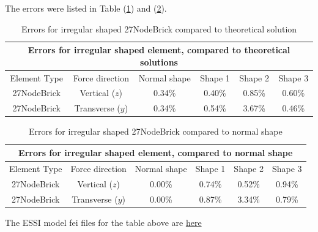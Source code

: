 \documentclass[fleqn,11pt]{article}
\begin{document}
The errors were listed in Table (\ref{table Errors for irregular shaped 27NodeBrick compared to theoretical solution}) and (\ref{talbe Errors for irregular shaped 27NodeBrick compared to normal shape}).


\begin{table}[H]
  \centering
  \caption{Errors for irregular shaped 27NodeBrick compared to theoretical solution}
  \label{table Errors for irregular shaped 27NodeBrick compared to theoretical solution}
  \begin{tabular}{|c|c|c|c|c|c|}
    \hline 
    \multicolumn{6}{|c|}{Errors for irregular shaped element, compared to theoretical solutions}   \\ \hline
    Element Type   & Force direction & Normal shape & Shape 1 & Shape 2 & Shape 3  \\ \hline 
    27NodeBrick     & Vertical ($z$)     & 0.34\% & 0.40\% & 0.85\% & 0.60\%  \\ \hline
    27NodeBrick     & Transverse ($y$)   & 0.34\% & 0.54\% & 3.67\% & 0.46\%  \\ \hline
  \end{tabular}
\end{table}

\begin{table}[H]
  \centering
    \caption{Errors for irregular shaped 27NodeBrick compared to normal shape}
  \label{talbe Errors for irregular shaped 27NodeBrick compared to normal shape}
  \begin{tabular}{|c|c|c|c|c|c|}
    \hline 
    \multicolumn{6}{|c|}{Errors for irregular shaped element, compared to normal shape}   \\ \hline
    Element Type   & Force direction & Normal shape & Shape 1 & Shape 2 & Shape 3  \\ \hline 
    27NodeBrick     & Vertical ($z$)    & 0.00\% & 0.74\% & 0.52\% & 0.94\%       \\ \hline
    27NodeBrick     & Transverse ($y$)  & 0.00\% & 0.87\% & 3.34\% & 0.79\%       \\ \hline
  \end{tabular}
\end{table}

The ESSI model fei files for the table above are \href{https://github.com/yuan-energy/ESSI_Verification/blob/master/27NodeBrick/cantilever_irregular_element/cantilever_irregular_element.tar.gz?raw=true}{here}
\end{document}
